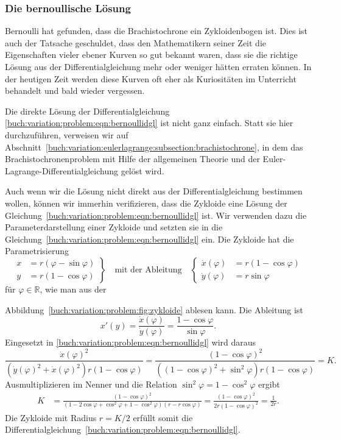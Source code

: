 %
%
\subsubsection{Die bernoullische Lösung}
Bernoulli hat gefunden, dass die Brachistochrone ein Zykloidenbogen ist.
Dies ist auch der Tatsache geschuldet, dass den Mathematikern seiner
Zeit die Eigenschaften vieler ebener Kurven so gut bekannt waren, dass
sie die richtige Lösung aus der Differentialgleichung mehr oder weniger
hätten erraten können.
In der heutigen Zeit werden diese Kurven oft eher als Kuriositäten
im Unterricht behandelt und bald wieder vergessen.

Die direkte Lösung der Differentialgleichung
\eqref{buch:variation:problem:eqn:bernoullidgl}
ist nicht ganz einfach.
Statt sie hier durchzuführen, verweisen wir auf
Abschnitt~\ref{buch:variation:eulerlagrange:subsection:brachistochrone},
in dem das Brachistochronenproblem mit Hilfe der allgemeinen
Theorie und der Euler-Lagrange-Differentialgleichung gelöst wird.

Auch wenn wir die Lösung nicht direkt aus der Differentialgleichung
bestimmen wollen, können wir immerhin verifizieren, dass die Zykloide
eine Lösung der Gleichung~\eqref{buch:variation:problem:eqn:bernoullidgl}
ist.
Wir verwenden dazu die Parameterdarstellung einer Zykloide und
setzten sie in die Gleichung~\eqref{buch:variation:problem:eqn:bernoullidgl}
ein.
Die Zykloide hat die Parametrisierung
%
\[
\left.
\begin{aligned}
x &= r(\varphi - \sin\varphi) 
\\
y &= r(1-\cos\varphi)
\end{aligned}
\right\}
\quad
\text{mit der Ableitung}
\quad
\left\{
\begin{aligned}
\dot{x}(\varphi) &= r(1-\cos\varphi)\\
\dot{y}(\varphi) &= r\sin\varphi
\end{aligned}
\right.
\]
für $\varphi\in\mathbb{R}$, wie man aus der

Abbildung~\ref{buch:variation:problem:fig:zykloide} ablesen kann.
Die Ableitung ist
\[
x'(y)
=
\frac{\dot{x}(\varphi)}{\dot{y}(\varphi)}
=
\frac{1-\cos\varphi}{\sin\varphi}.
\]
Eingesetzt in \eqref{buch:variation:problem:eqn:bernoullidgl}
wird daraus
\[
\frac{\dot{x}(\varphi)^2}{
(\dot{y}(\varphi)^2 +\dot{x}(\varphi)^2)
r(1-\cos\varphi)
}
=
\frac{(1-\cos\varphi)^2}{
((1-\cos\varphi)^2+\sin^2\varphi)
r
(1-\cos\varphi)
}
=
K.
\]
Ausmultiplizieren im Nenner und die Relation $\sin^2\varphi=1-\cos^2\varphi$
ergibt
\begin{align*}
K
&=
\frac{(1-\cos\varphi)^2}{
(1-2\cos\varphi+\cos^2\varphi+1-\cos^2\varphi)
(r-r\cos\varphi)
}
=
\frac{(1-\cos\varphi)^2}{2r(1-\cos\varphi)^2}
=
\frac{1}{2r}.
\end{align*}
Die Zykloide mit Radius $r=K/2$ erfüllt somit die
Differentialgleichung~\eqref{buch:variation:problem:eqn:bernoullidgl}.

